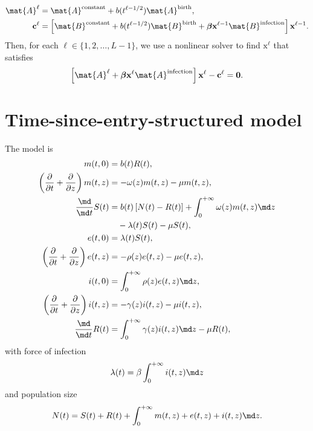 \documentclass{jpmarticle}
\renewcommand{\vec}[1]{\boldsymbol{\mathrm{#1}}}
\begin{document}
\begin{equation}
  \begin{split}
    \mat{A}^{\ell} &=
    \mat{A}^{\text{constant}}
    + b(t^{\ell - 1 / 2}) \mat{A}^{\text{birth}},
    \\
    \vec{c}^{\ell} &=
    \left[
      \mat{B}^{\text{constant}}
      + b(t^{\ell - 1 / 2}) \mat{B}^{\text{birth}}
      + \vec{\beta} \vec{x}^{\ell - 1} \mat{B}^{\text{infection}}
    \right] \vec{x}^{\ell - 1}.
  \end{split}
\end{equation}
Then, for each $\ell \in \{1, 2, \ldots, L - 1\}$,
we use a nonlinear solver to find $\vec{x}^{\ell}$ that satisfies
\begin{equation}
  \left[
    \mat{A}^{\ell}
    + \vec{\beta} \vec{x}^{\ell} \mat{A}^{\text{infection}}
  \right] \vec{x}^{\ell}
  - \vec{c}^{\ell}
  = \vec{0}.
\end{equation}


\section{Time-since-entry-structured model}

The model is
\begin{equation}
  \label{model_time_since_entry_structured}
  \begin{split}
    m(t, 0) &=
    b(t) R(t),
    \\
    \left(\frac{\partial}{\partial t}
      + \frac{\partial}{\partial z}\right)
    m(t, z) &=
    - \omega(z) m(t, z) - \mu m(t, z),
    \\
    \frac{\md}{\md t} S(t) &=
    b(t) \left[N(t) - R(t)\right]
    + \int_0^{+\infty} \omega(z) m(t, z) \md z
    \\ & \quad {}
    - \lambda(t) S(t) - \mu S(t),
    \\
    e(t, 0) &=
    \lambda(t) S(t),
    \\
    \left(\frac{\partial}{\partial t}
      + \frac{\partial}{\partial z}\right)
    e(t, z) &=
    - \rho(z) e(t, z) - \mu e(t, z),
    \\
    i(t, 0) &=
    \int_0^{+\infty} \rho(z) e(t, z) \md z,
    \\
    \left(\frac{\partial}{\partial t}
      + \frac{\partial}{\partial z}\right)
    i(t, z) &=
    - \gamma(z) i(t, z) - \mu i(t, z),
    \\
    \frac{\md}{\md t} R(t) &=
    \int_0^{+\infty} \gamma(z) i(t, z) \md z
    - \mu R(t),
  \end{split}
\end{equation}
with force of infection
\begin{equation}
  \lambda(t) = \beta \int_0^{+\infty} i(t, z) \md z
\end{equation}
and population size
\begin{equation}
  N(t) =
  S(t) + R(t)
  + \int_0^{+\infty} m(t, z) + e(t, z) + i(t, z) \md z.
\end{equation}
\end{document}
